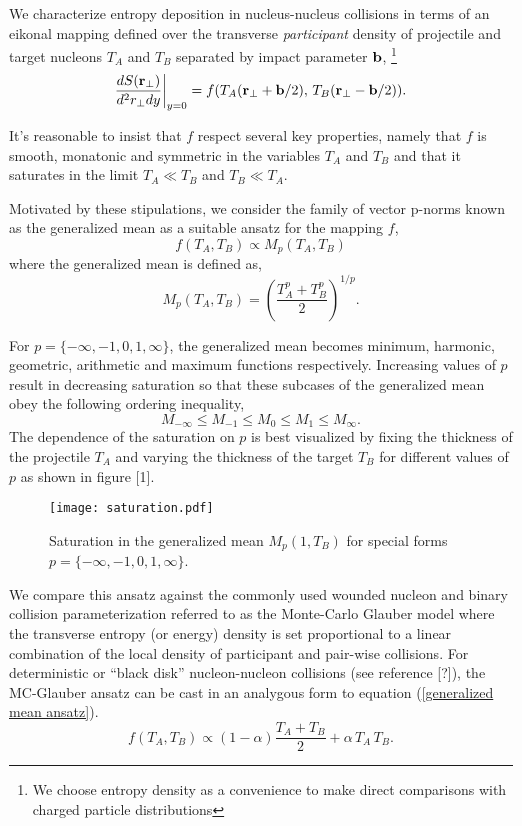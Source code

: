 \documentclass[aps,prl,reprint,amsmath,nofootinbib]{revtex4-1}
\begin{document}
We characterize entropy deposition in nucleus-nucleus collisions in terms of an eikonal mapping defined over the transverse \emph{participant} density 
of projectile and target nucleons $T_A$ and $T_B$ separated by impact parameter ${\bf b}$,
\footnote{We choose entropy density as a convenience to make direct comparisons with charged particle distributions}
\begin{equation}
  \frac{dS({\bf r}_\perp)}{d^2r_\perp dy} \biggr \rvert_{y=0}  = f(T_A({\bf r}_\perp + {\bf b}/2),\,T_B({\bf r}_\perp - {\bf b}/2)).
\end{equation}

It's reasonable to insist that $f$ respect several key properties, namely that $f$ is smooth, monatonic and symmetric in 
the variables $T_A$ and $T_B$ and that it saturates in the limit $T_A \ll T_B$ and $T_B \ll T_A$.

Motivated by these stipulations, we consider the family of vector p-norms known as the generalized mean as a suitable ansatz for the mapping $f$,
\begin{equation}
 \label{generalized mean ansatz}
 f(T_A, T_B) \propto M_p(T_A,T_B) 
\end{equation}
where the generalized mean is defined as,
\begin{equation}
 \label{generalized mean}
 M_p(T_A,T_B) = \left( \frac{T_A^p + T_B^p}{2} \right)^{1/p}.
\end{equation}

For $p = \{-\infty,-1,0,1,\infty\}$, the generalized mean becomes minimum, harmonic, geometric, arithmetic and maximum functions respectively. Increasing 
values of $p$ result in decreasing saturation so that these subcases of the generalized mean obey the following ordering inequality, 
\begin{equation}
 M_{-\infty} \le M_{-1} \le M_{0} \le M_{1} \le M_{\infty}.
\end{equation}
The dependence of the saturation on $p$ is best visualized by fixing the thickness of the projectile $T_A$ and varying the thickness of the target $T_B$ for 
different values of $p$ as shown in figure [1].
\begin{figure}[b]
 \texttt{[image: saturation.pdf]}
 \caption{Saturation in the generalized mean $M_p(1,T_B)$ for special forms $p=\{-\infty, -1, 0, 1, \infty\}$.}
\end{figure}

We compare this ansatz against the commonly used wounded nucleon and binary collision parameterization referred to as the Monte-Carlo Glauber model where
the transverse entropy (or energy) density is set proportional to a linear combination of the local density of participant and pair-wise collisions. For 
deterministic or ``black disk'' nucleon-nucleon collisions (see reference [?]), the MC-Glauber ansatz can be cast in an analygous form to equation 
(\ref{generalized mean ansatz}). 
\begin{equation}
 f(T_A,T_B) \propto (1-\alpha)\frac{T_A+T_B}{2} + \alpha \, T_A\, T_B. 
\end{equation}
\end{document}
